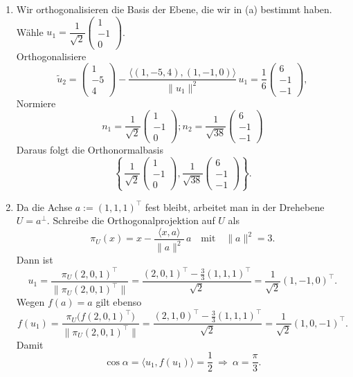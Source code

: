 \documentclass[11pt, a4paper]{article}
\begin{document}
\begin{enumerate}
  \item
  Wir orthogonalisieren die Basis der Ebene, die wir in (a) bestimmt haben.\\
  Wähle $u_1=\dfrac{1}{\sqrt2}\begin{pmatrix}1\\-1\\0\end{pmatrix}$.\\
  Orthogonalisiere \\
  \[
  \tilde u_2=\begin{pmatrix}1\\-5\\4\end{pmatrix}
  -\frac{\langle(1,-5,4),(1,-1,0)\rangle}{\|u_1\|^2}\,u_1
  =\frac{1}{6}\begin{pmatrix}6\\-1\\-1\end{pmatrix},
  \]
  Normiere \\
  \[
  n_1=\frac{1}{\sqrt{2}}\begin{pmatrix}1\\-1\\0\end{pmatrix} ; 
  n_2=\frac{1}{\sqrt{38}}\begin{pmatrix}6\\-1\\-1\end{pmatrix} 
  \]
  Daraus folgt die Orthonormalbasis
  \[
  \left\{\,
  \frac{1}{\sqrt{2}}\begin{pmatrix}1\\-1\\0\end{pmatrix},
  \frac{1}{\sqrt{38}}\begin{pmatrix}6\\-1\\-1\end{pmatrix}\right\}.
  \]
  \item
  Da die Achse $a:=(1,1,1)^{\top}$ fest bleibt, arbeitet man in der Drehebene
$U=a^{\perp}$. Schreibe die Orthogonalprojektion auf $U$ als
\[
\pi_U(x)=x-\frac{\langle x,a\rangle}{\|a\|^2}\,a
\quad\text{mit}\quad \|a\|^2=3.
\]
Dann ist
\[
u_1=\frac{\pi_U(2,0,1)^{\top}}{\|\pi_U(2,0,1)^{\top}\|}
=\frac{(2,0,1)^{\top}-\frac{3}{3}(1,1,1)^{\top}}{\sqrt2}
=\frac{1}{\sqrt2}(1,-1,0)^{\top}.
\]
Wegen $f(a)=a$ gilt ebenso
\[
f(u_1)=\frac{\pi_U\bigl(f(2,0,1)^{\top}\bigr)}{\|\pi_U(2,0,1)^{\top}\|}
=\frac{(2,1,0)^{\top}-\frac{3}{3}(1,1,1)^{\top}}{\sqrt2}
=\frac{1}{\sqrt2}(1,0,-1)^{\top}.
\]
Damit
\[
\cos\alpha=\langle u_1,f(u_1)\rangle=\frac12
\ \Rightarrow\ \alpha=\frac{\pi}{3}.
\]


\end{enumerate}
\end{document}
